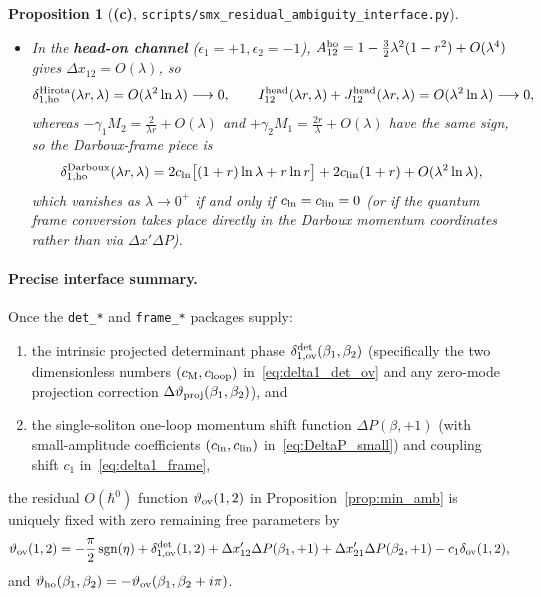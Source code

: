 \documentclass[11pt,a4paper]{article}
\newcommand{\Lc}{\textsf{\textbf{(c)}}}
\newcommand{\smxamb}{\texttt{scripts/\allowbreak smx\_\allowbreak residual\_\allowbreak ambiguity\_\allowbreak interface.py}}
\DeclareMathOperator{\sgn}{sgn}
\newtheorem{proposition}{Proposition}[section]
\theoremstyle{remark}
\begin{document}
\begin{proposition}[\Lc, \smxamb]
\begin{enumerate}
\begin{itemize}
\item In the \textbf{head-on channel} ($\epsilon_1=+1,\epsilon_2=-1$), $A_{12}^{\rm ho}=1-\frac32\lambda^2(1-r^2)+O(\lambda^4)$ gives $\Delta x_{12}=O(\lambda)$, so
\begin{equation}\label{eq:lim_Hirota_ho}
\delta_{1,\rm ho}^{\rm Hirota}(\lambda r,\lambda)=O(\lambda^2\ln\lambda)\longrightarrow 0,\qquad
I_{12}^{\rm head}(\lambda r,\lambda)+J_{12}^{\rm head}(\lambda r,\lambda)=O(\lambda^2\ln\lambda)\longrightarrow 0,
\end{equation}
whereas $-\gamma_1 M_2=\frac{2}{\lambda r}+O(\lambda)$ and $+\gamma_2 M_1=\frac{2r}{\lambda}+O(\lambda)$ have the \emph{same} sign, so the Darboux-frame piece is
\begin{equation}\label{eq:lim_Darboux_ho}
\delta_{1,\rm ho}^{\rm Darboux}(\lambda r,\lambda)=2c_{\ln}\bigl[(1+r)\ln\lambda+r\ln r\bigr]+2c_{\rm lin}(1+r)+O(\lambda^2\ln\lambda),
\end{equation}
which vanishes as $\lambda\to 0^+$ if and only if $c_{\ln}=c_{\rm lin}=0$ (or if the quantum frame conversion takes place directly in the Darboux momentum coordinates rather than via $\Delta x' \Delta P$).
\end{itemize}
\end{enumerate}
\end{proposition}

\paragraph{Precise interface summary.}
Once the \texttt{det\_*} and \texttt{frame\_*} packages supply:
\begin{enumerate}
\item the intrinsic projected determinant phase $\delta_{1,\rm ov}^{\rm det}(\beta_1,\beta_2)$ (specifically the two dimensionless numbers $(c_{\rm M},c_{\rm loop})$ in~\eqref{eq:delta1_det_ov} and any zero-mode projection correction $\Delta\vartheta_{\rm proj}(\beta_1,\beta_2)$), and
\item the single-soliton one-loop momentum shift function $\Delta P(\beta,+1)$ (with small-amplitude coefficients $(c_{\ln},c_{\rm lin})$ in~\eqref{eq:DeltaP_small}) and coupling shift $c_1$ in~\eqref{eq:delta1_frame},
\end{enumerate}
the residual $O(\hbar^0)$ function $\vartheta_{\rm ov}(1,2)$ in Proposition~\ref{prop:min_amb} is uniquely fixed with zero remaining free parameters by
\begin{equation}\label{eq:interface_master}
\vartheta_{\rm ov}(1,2)=-\frac\pi2\sgn(\eta)+\delta_{1,\rm ov}^{\rm det}(1,2)+\Delta x_{12}'\Delta P(\beta_1,+1)+\Delta x_{21}'\Delta P(\beta_2,+1)-c_1\delta_{\rm ov}(1,2),
\end{equation}
and $\vartheta_{\rm ho}(\beta_1,\beta_2)=-\vartheta_{\rm ov}(\beta_1,\beta_2+i\pi)$.
\end{document}
